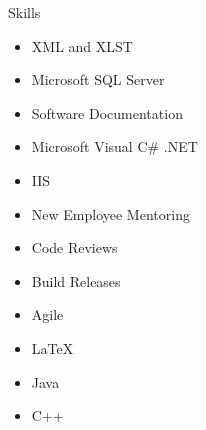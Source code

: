 \documentclass{resume} %
\begin{document}



\begin{rSection}{Skills}
\begin{multicols}{3}
\begin{enumerate}
\begin{itemize}
\item XML and XLST
\item Microsoft SQL Server
\item Software Documentation
\item Microsoft Visual C\# .NET
\item IIS
\item New Employee Mentoring
\item Code Reviews
\item Build Releases
\item Agile
\item LaTeX
\item Java
\item C++
\end{itemize}
\end{enumerate}
\end{multicols}
\end{rSection}

\end{document}
